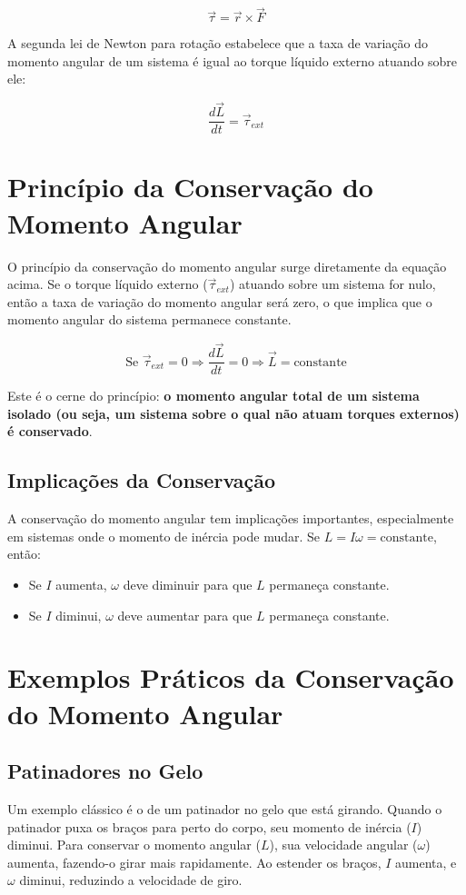\documentclass{article}
\begin{document}
$$ \vec{\tau} = \vec{r} \times \vec{F} $$

A segunda lei de Newton para rotação estabelece que a taxa de variação do momento angular de um sistema é igual ao torque líquido externo atuando sobre ele:

$$ \frac{d\vec{L}}{dt} = \vec{\tau}_{ext} $$

\section{Princípio da Conservação do Momento Angular}
O princípio da conservação do momento angular surge diretamente da equação acima. Se o torque líquido externo ($\vec{\tau}_{ext}$) atuando sobre um sistema for nulo, então a taxa de variação do momento angular será zero, o que implica que o momento angular do sistema permanece constante.

$$ \text{Se } \vec{\tau}_{ext} = 0 \Rightarrow \frac{d\vec{L}}{dt} = 0 \Rightarrow \vec{L} = \text{constante} $$

Este é o cerne do princípio: \textbf{o momento angular total de um sistema isolado (ou seja, um sistema sobre o qual não atuam torques externos) é conservado}.

\subsection{Implicações da Conservação}
A conservação do momento angular tem implicações importantes, especialmente em sistemas onde o momento de inércia pode mudar. Se $L = I\omega = \text{constante}$, então:
\begin{itemize}
    \item Se $I$ aumenta, $\omega$ deve diminuir para que $L$ permaneça constante.
    \item Se $I$ diminui, $\omega$ deve aumentar para que $L$ permaneça constante.
\end{itemize}

\section{Exemplos Práticos da Conservação do Momento Angular}

\subsection{Patinadores no Gelo}
Um exemplo clássico é o de um patinador no gelo que está girando. Quando o patinador puxa os braços para perto do corpo, seu momento de inércia ($I$) diminui. Para conservar o momento angular ($L$), sua velocidade angular ($\omega$) aumenta, fazendo-o girar mais rapidamente. Ao estender os braços, $I$ aumenta, e $\omega$ diminui, reduzindo a velocidade de giro.
\end{document}
